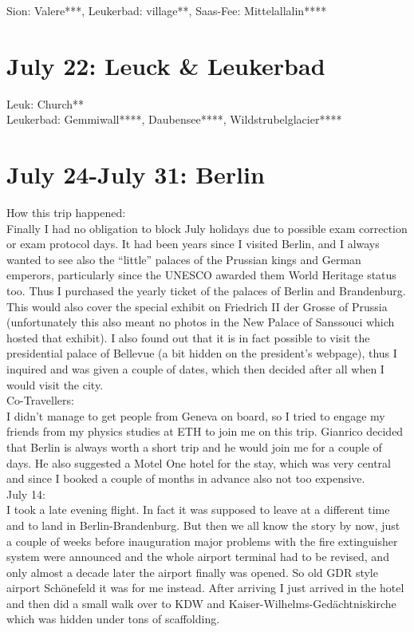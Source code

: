 Sion: Valere***, Leukerbad: village**, Saas-Fee: Mittelallalin****

\section{July 22: Leuck \& Leukerbad}
\label{Leuk2012}

Leuk: Church**\\
Leukerbad: Gemmiwall****, Daubensee****, Wildstrubelglacier****

\section{July 24-July 31: Berlin}
\label{Berlin2012}

How this trip happened:\\
Finally I had no obligation to block July holidays due to possible exam correction or exam protocol days. It had been years since I visited Berlin, and I always wanted to see also the ``little'' palaces of the Prussian kings and German emperors, particularly since the UNESCO awarded them World Heritage status too. Thus I purchased the yearly ticket of the palaces of Berlin and Brandenburg. This would also cover the special exhibit on Friedrich II der Grosse of Prussia (unfortunately this also meant no photos in the New Palace of Sanssouci which hosted that exhibit). I also found out that it is in fact possible to visit the presidential palace of Bellevue (a bit hidden on the president's webpage), thus I inquired and was given a couple of dates, which then decided after all when I would visit the city.\\

Co-Travellers:\\
I didn't manage to get people from Geneva on board, so I tried to engage my friends from my physics studies at ETH to join me on this trip. Gianrico decided that Berlin is always worth a short trip and he would join me for a couple of days. He also suggested a Motel One hotel for the stay, which was very central and since I booked a couple of months in advance also not too expensive.\\

July 14:\\
I took a late evening flight. In fact it was supposed to leave at a different time and to land in Berlin-Brandenburg. But then we all know the story by now, just a couple of weeks before inauguration major problems with the fire extinguisher system were announced and the whole airport terminal had to be revised, and only almost a decade later the airport finally was opened. So old GDR style airport Sch\"onefeld it was for me instead. After arriving I just arrived in the hotel and then did a small walk over to KDW and Kaiser-Wilhelms-Ged\"achtniskirche which was hidden under tons of scaffolding.\\

